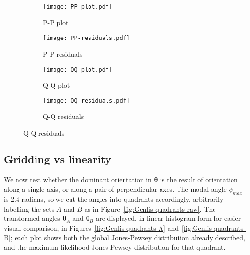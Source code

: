 \documentclass[../../ArchStats.tex]{subfiles}
\begin{document}
\begin{figure}[!ht]
\centering
\caption{Probability plots of the fitted candidate distributions and their residuals.}
\label{fig:Genlis-prob-plots}
%
\begin{subfigure}[t]{0.45\textwidth}
\caption{P-P plot}
\texttt{[image: PP-plot.pdf]}
\end{subfigure}
%
\begin{subfigure}[t]{0.45\textwidth}
\caption{P-P residuals}
\texttt{[image: PP-residuals.pdf]}
\end{subfigure}

\vspace{10pt}
\begin{subfigure}[t]{0.45\textwidth}
\caption{Q-Q plot}
\texttt{[image: QQ-plot.pdf]}
\end{subfigure}
%
\begin{subfigure}[t]{0.45\textwidth}
\caption{Q-Q residuals}
\texttt{[image: QQ-residuals.pdf]}
\end{subfigure}
%
\end{figure}


\subsection{Gridding vs linearity}
\label{sec:Genlis-gridding}
We now test whether the dominant orientation in $\boldsymbol{\theta}$ is the result of orientation along a single axis, or along a pair of perpendicular axes. The modal angle $\phi_{max}$ is 2.4 radians, so we cut the angles into quadrants accordingly, arbitrarily labelling the sets $A$ and $B$ as in Figure~\ref{fig:Genlis-quadrants-raw}. The transformed angles $\boldsymbol{\theta}_A$ and $\boldsymbol{\theta}_B$ are displayed, in linear histogram form for easier visual comparison, in Figures~\ref{fig:Genlis-quadrants-A} and~\ref{fig:Genlis-quadrants-B}; each plot shows both the global Jones-Pewsey distribution already described, and the maximum-likelihood Jones-Pewsey distribution for that quadrant.
\end{document}
